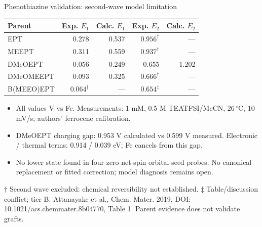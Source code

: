 \begin{frame}{Phenothiazine validation: second-wave model limitation}
  \small
  \begin{center}
  \begin{tabular}{lrrrr}
    \toprule
    Parent & Exp. $E_1$ & Calc. $E_1$ & Exp. $E_2$ & Calc. $E_2$ \\
    \midrule
    EPT & 0.278 & 0.537 & $0.956^\dagger$ & --- \\
    MEEPT & 0.311 & 0.559 & $0.937^\dagger$ & --- \\
    DMeOEPT & 0.056 & 0.249 & 0.655 & 1.202 \\
    DMeOMEEPT & 0.093 & 0.325 & $0.666^\dagger$ & --- \\
    B(MEEO)EPT & $0.064^\ddagger$ & --- & $0.654^\ddagger$ & --- \\
    \bottomrule
  \end{tabular}
  \end{center}
  \begin{itemize}
    \item All values V vs Fc. Measurements: 1 mM, 0.5 M TEATFSI/MeCN,
      $26\,^{\circ}$C, 10 mV/s; authors' ferrocene calibration.
    \item DMeOEPT charging gap: 0.953 V calculated vs 0.599 V measured.
      Electronic / thermal terms: 0.914 / 0.039 eV; Fc cancels from this gap.
    \item No lower state found in four zero-net-spin orbital-seed probes.
      No canonical replacement or fitted correction; model diagnosis remains open.
  \end{itemize}
  \vfill\scriptsize $\dagger$ Second wave excluded: chemical reversibility not established.
  $\ddagger$ Table/discussion conflict; tier B. Attanayake et al., Chem. Mater. 2019,
  DOI: 10.1021/acs.chemmater.8b04770, Table 1. Parent evidence does not validate grafts.
\end{frame}

